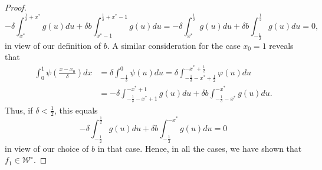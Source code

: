 \documentclass[10pt,a4paper]{amsart}
\begin{document}
\begin{proof}
    $$
    -\delta \int_{x^*}^{\frac{1}{\delta}+x^*}g(u)du + \delta b \int_{x^*-1}^{\frac{1}{\delta}+x^*-1}g(u)du
    =
    -\delta \int_{x^*}^{\frac12}g(u)du + \delta b \int_{-\frac12}^{\frac12}g(u)du = 0,
    $$
    in view of our definition of $b$.
    A similar consideration for the case $x_0=1$ reveals that
    \begin{align*}
        \int_0^1 \psi\left( \frac{x-x_0}{\delta}\right)dx
        &=\delta \int_{-\frac{1}{\delta}}^{0} \psi(u)du
        =\delta
        \int_{-\frac{1}{\delta}-x^*+\frac12}^{-x^*+\frac12} \varphi(u)du\\
        &=
        -\delta \int_{-\frac{1}{\delta}-x^*+1}^{-x^*+1}g(u)du + \delta b \int_{-\frac{1}{\delta}-x^*}^{-x^*}g(u)du.
    \end{align*}
    Thus, if $\delta<\frac12$, this equals 
    $$
    -\delta \int_{-\frac12}^{\frac12}g(u)du + \delta b \int_{-\frac12}^{-x^*}g(u)du = 0
    $$
    in view of our choice of $b$ in that case.
    Hence, in all the cases, we have shown that $f_1\in\mathcal W^\circ$.
\end{proof}
\end{document}
